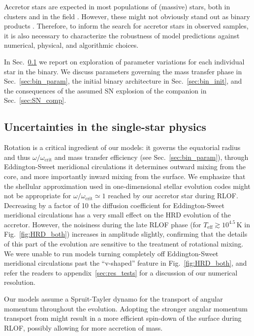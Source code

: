 \documentclass[twocolumn,twocolappendix,trackchanges]{aastex63}
\DeclareRobustCommand{\Figref}[1]{Fig.~\ref{#1}}
\DeclareRobustCommand{\Secref}[1]{Sec.~\ref{#1}}
\begin{document}
Accretor stars are expected in most populations of (massive)
stars, both in clusters \citep[e.g.,][]{chen:09, wang:20} and in the field
\citep[e.g.,][]{demink:11, demink:13}. However, these might not obviously stand
out as binary products \citep[e.g.,][]{renzo:19walk}. Therefore, to
inform the search for accretor stars in observed samples, it is
also necessary to characterize the robustness of model predictions
against numerical, physical, and algorithmic choices.

In \Secref{sec:single_star_uncertainties}
we report on exploration of parameter variations for each individual
star in the binary. We discuss parameters governing the mass transfer phase in
\Secref{sec:bin_param}, the initial binary architecture in
\Secref{sec:bin_init}, and the consequences of the assumed SN
explosion of the companion in \Secref{sec:SN_comp}.


\subsection{Uncertainties in the single-star physics}
\label{sec:single_star_uncertainties}

Rotation is a critical ingredient of our models: it governs the
equatorial radius and thus $\omega/\omega_\mathrm{crit}$
and mass transfer efficiency (see \Secref{sec:bin_param}), through
Eddington-Sweet meridional circulations it determines outward mixing
from the core, and more importantly inward mixing from the surface.
We emphasize that the shellular approximation used in one-dimensional
stellar evolution codes might not be appropriate for
$\omega/\omega_\mathrm{crit}\simeq 1$ reached by our accretor star
during RLOF. Decreasing by a factor of 10 the diffusion coefficient
for Eddington-Sweet meridional circulations has a very small effect on
the HRD evolution of the accretor. However, the noisiness during the
late RLOF phase (for $T_\mathrm{eff}\gtrsim10^{4.5}$\,K in
\Figref{fig:HRD_both}) increases in amplitude slightly, confirming
that the details of this part of the evolution are sensitive to the
treatment of rotational mixing. We were unable to run models turning
completely off Eddington-Sweet meridional circulations past the
``v-shaped'' feature in \Figref{fig:HRD_both}, and refer the readers
to appendix~\ref{sec:res_tests} for a discussion of our numerical resolution.

Our models assume a Spruit-Tayler dynamo \citep{spruit:02} for the
transport of angular momentum throughout the evolution. Adopting the
stronger angular momentum transport from \cite{fuller:19} might result
in a more efficient spin-down of the surface during RLOF, possibly
allowing for more accretion of mass.
\end{document}
